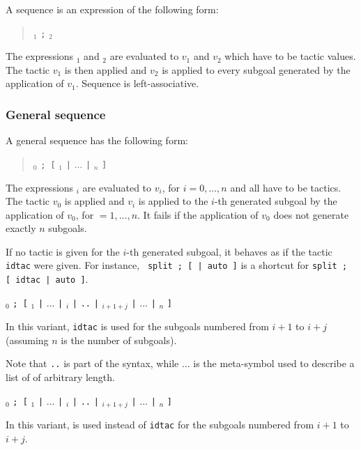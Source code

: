 A sequence is an expression of the following form:
\begin{quote}
{\tacexpr}$_1$ {\tt ;} {\tacexpr}$_2$
\end{quote}
The expressions {\tacexpr}$_1$ and {\tacexpr}$_2$ are evaluated
to $v_1$ and $v_2$ which have to be tactic values. The tactic $v_1$ is
then applied and $v_2$ is applied to every subgoal generated by the
application of $v_1$. Sequence is left-associative.

\subsubsection[General sequence]{General sequence\tacindex{;[\ldots$\mid$\ldots$\mid$\ldots]}}

A general sequence has the following form:
\begin{quote}
{\tacexpr}$_0$ {\tt ; [} {\tacexpr}$_1$ {\tt |} $...$ {\tt |}
{\tacexpr}$_n$ {\tt ]}
\end{quote}
The expressions {\tacexpr}$_i$ are evaluated to $v_i$, for $i=0,...,n$
and all have to be tactics. The tactic $v_0$ is applied and $v_i$ is
applied to the $i$-th generated subgoal by the application of $v_0$,
for $=1,...,n$. It fails if the application of $v_0$ does not generate
exactly $n$ subgoals.

\begin{Variants}
  \item If no tactic is given for the $i$-th generated subgoal, it
behaves as if the tactic {\tt idtac} were given. For instance, {\tt
split ; [ | auto ]} is a shortcut for
{\tt split ; [ idtac | auto ]}.

  \item {\tacexpr}$_0$ {\tt ; [} {\tacexpr}$_1$ {\tt |} $...$ {\tt |}
    {\tacexpr}$_i$ {\tt |} {\tt ..} {\tt |} {\tacexpr}$_{i+1+j}$ {\tt |}
    $...$ {\tt |} {\tacexpr}$_n$ {\tt ]}

  In this variant, {\tt idtac} is used for the subgoals numbered from
  $i+1$ to $i+j$ (assuming $n$ is the number of subgoals).

  Note that {\tt ..} is part of the syntax, while $...$ is the meta-symbol used
  to describe a list of {\tacexpr} of arbitrary length.

  \item {\tacexpr}$_0$ {\tt ; [} {\tacexpr}$_1$ {\tt |} $...$ {\tt |}
    {\tacexpr}$_i$ {\tt |} {\tacexpr} {\tt ..} {\tt |}
    {\tacexpr}$_{i+1+j}$ {\tt |} $...$ {\tt |} {\tacexpr}$_n$ {\tt ]}

  In this variant, {\tacexpr} is used instead of {\tt idtac} for the
  subgoals numbered from $i+1$ to $i+j$.

\end{Variants}



